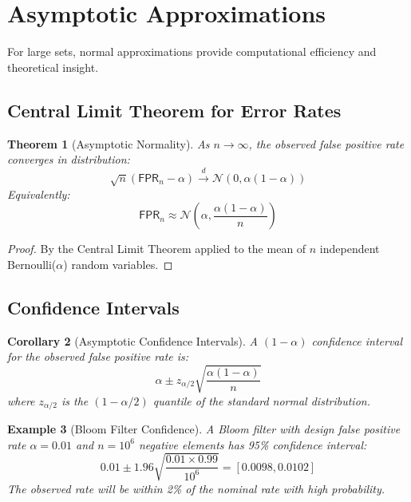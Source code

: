 \documentclass[11pt,final,hidelinks]{article}
\newtheorem{theorem}{Theorem}[section]
\newtheorem{corollary}[theorem]{Corollary}
\newtheorem{example}[theorem]{Example}
\newcommand{\FPR}{\mathsf{FPR}}  %
\newcommand{\fprate}{\alpha}
\newcommand{\Normal}[2]{\mathcal{N}(#1, #2)}
\begin{document}
\section{Asymptotic Approximations}

For large sets, normal approximations provide computational efficiency and theoretical insight.

\subsection{Central Limit Theorem for Error Rates}

\begin{theorem}[Asymptotic Normality]
As $n \to \infty$, the observed false positive rate converges in distribution:
\begin{equation}
\sqrt{n}(\FPR_n - \fprate) \xrightarrow{d} \Normal{0}{\fprate(1-\fprate)}
\end{equation}
Equivalently:
\begin{equation}
\FPR_n \approx \Normal{\fprate}{\frac{\fprate(1-\fprate)}{n}}
\end{equation}
\end{theorem}

\begin{proof}
By the Central Limit Theorem applied to the mean of $n$ independent Bernoulli($\fprate$) random variables.
\end{proof}

\subsection{Confidence Intervals}

\begin{corollary}[Asymptotic Confidence Intervals]
A $(1-\alpha)$ confidence interval for the observed false positive rate is:
\begin{equation}
\fprate \pm z_{\alpha/2}\sqrt{\frac{\fprate(1-\fprate)}{n}}
\end{equation}
where $z_{\alpha/2}$ is the $(1-\alpha/2)$ quantile of the standard normal distribution.
\end{corollary}

\begin{example}[Bloom Filter Confidence]
A Bloom filter with design false positive rate $\fprate = 0.01$ and $n = 10^6$ negative elements has 95\% confidence interval:
\begin{equation}
0.01 \pm 1.96\sqrt{\frac{0.01 \times 0.99}{10^6}} = [0.0098, 0.0102]
\end{equation}
The observed rate will be within 2\% of the nominal rate with high probability.
\end{example}
\end{document}
